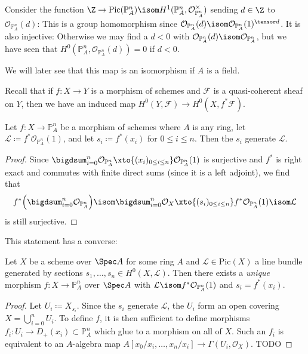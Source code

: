 \documentclass[wip, algebra]{bsteffan-lecturenotes}
\newcommand{\cO}{\mathcal{O}}
\newcommand{\cF}{\mathcal{F}}
\newcommand{\cL}{\mathcal{L}}
\renewcommand{\P}{\mathbb{P}}
\newcommand{\Pic}{\mathrm{Pic}}
\begin{document}
\begin{example}
	Consider the function $\Z \to \Pic(\P^n_A) \isom H^1(\P^n_A, \cO_{\P^n_A}^\times)$ sending $d \in \Z$ to $\cO_{\P^n_A}(d)$:
	This is a group homomorphism since $\cO_{\P^n_A}(d) \isom \cO_{\P^n_A}(1)^{\tensor d}$. 
	It is also injective:
	Otherwise we may find a $d < 0$ with $\cO_{\P^n_A}(d) \isom \cO_{\P^n_A}$, but we have seen that $H^0(\P^n_A, \cO_{\P^n_A}(d)) = 0$ if $d < 0$.
	
	We will later see that this map is an isomorphism if $A$ is a field.
\end{example}
Recall that if $f\colon X \to Y$ is a morphism of schemes and $\cF$ is a quasi-coherent sheaf on $Y$, then we have an induced map $H^0(Y, \cF) \to H^0(X, f^* \cF)$.
\begin{proposition}
	Let $f\colon X \to \P^n_A$ be a morphism of schemes where $A$ is any ring, let $\cL \coloneq f^* \cO_{\P^n_A}(1)$, and let $s_i \coloneq f^*(x_i)$ for $0 \leq i \leq n$.
	Then the $s_i$ generate $\cL$.
\end{proposition}
\begin{proof}
	Since $\bigdsum_{i = 0}^n \cO_{\P^n_A} \xto{(x_i)_{0 \leq i \leq n}} \cO_{\P^n_A}(1)$ is surjective and $f^*$ is right exact and commutes with finite direct sums (since it is a left adjoint), we find that 
	\begin{equation*}
		f^*\Bigl(\bigdsum_{i = 0}^n \cO_{\P^n_A}\Bigr) \isom \bigdsum_{i = 0}^n \cO_X \xto{(s_i)_{0 \leq i \leq n}} f^* \cO_{\P^n_A}(1) \isom \cL
	\end{equation*}
	is still surjective.
\end{proof}
This statement has a converse: 
\begin{proposition}\label{prp:inv:pullbackmap}
	Let $X$ be a scheme over $\Spec A$ for some ring $A$ and $\cL \in \Pic(X)$ a line bundle generated by sections $s_1, \ldots, s_n \in H^0(X, \cL)$.
	Then there exists a \emph{unique} morphism $f\colon X \to \P^n_A$ over $\Spec A$ with $\cL \isom f^* \cO_{\P^n_A}(1)$ and $s_i = f^*(x_i)$.
\end{proposition}
\begin{proof}
	Let $U_i \coloneq X_{s_i}$.
	Since the $s_i$ generate $\cL$, the $U_i$ form an open covering $X = \bigcup_{i = 0}^n U_i$.
	To define $f$, it is then sufficient to define morphisms $f_i\colon U_i \to D_+(x_i) \subset \P^n_A$ which glue to a morphism on all of $X$. 
	Such an $f_i$ is equivalent to an $A$-algebra map $A[x_0 / x_i, \ldots, x_n / x_i] \to \Gamma(U_i, \cO_X)$.
	TODO
\end{proof}
\end{document}
